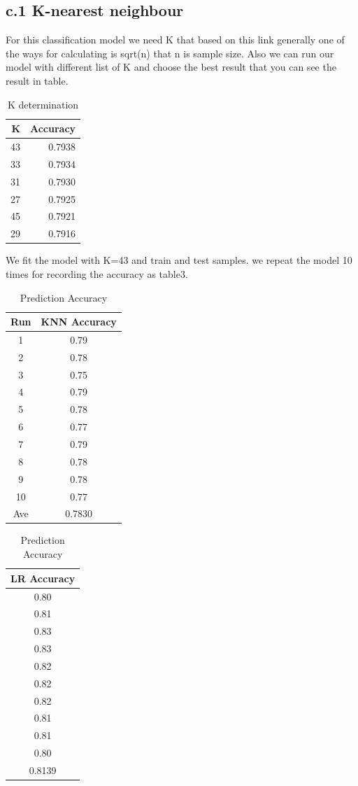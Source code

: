 \documentclass[a4paper, 11pt]{article}
\begin{document}
\subsection*{c.1  K-nearest neighbour}
For this classification model we need K that based on this link generally one of the ways for calculating is sqrt(n) that n is sample size. Also we can run our model with different list of K and choose the best result that you can see the result in table.
\begin{table}[H]
	\centering
	\caption{K determination}
	\label{table2}
	\begin{tabular}{rr}
		\hline
		 K & Accuracy \\ 
		\hline
		43 & 0.7938  \\ 
		33 & 0.7934  \\ 
		31 & 0.7930  \\ 
		27 & 0.7925 \\ 
		45 & 0.7921 \\ 
		29 & 0.7916  \\ 
		\hline
	\end{tabular}
\end{table}
We fit the model with K=43 and train and test samples. we repeat the model 10 times for recording the accuracy as table3.
 \begin{table}[H]
 	\centering
 	\caption{Prediction Accuracy }
 	\label{table3}
 	\begin{tabular}{cc}
 		\hline
 		 Run & KNN Accuracy \\ 
 		\hline
 		1 & 0.79 \\ 
 		2 & 0.78 \\ 
 		3 & 0.75 \\ 
 		4 & 0.79 \\ 
 		5 & 0.78 \\ 
 		6 & 0.77 \\ 
 		7 & 0.79 \\ 
 		8 & 0.78 \\ 
 		9 & 0.78 \\ 
 		10 & 0.77\\ 
 		Ave & 0.7830\\
 		\hline
 	\end{tabular}
 		\quad
 \begin{tabular}{c}
 	\hline
 	LR Accuracy \\ 
 	\hline
 	0.80 \\ 
 	0.81  \\ 
 	 0.83  \\ 
 	 0.83  \\ 
 	 0.82  \\ 
 	 0.82  \\ 
 	 0.82  \\ 
 	 0.81  \\ 
 	 0.81  \\ 
 	 0.80  \\ 
    0.8139 \\
 	\hline
 \end{tabular}		
 \end{table}
\end{document}
